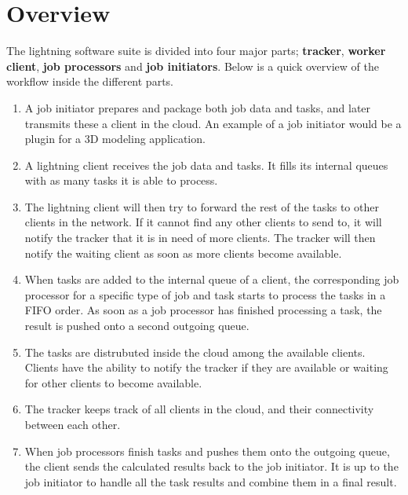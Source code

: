 \chapter{Overview}
The lightning software suite is divided into four major parts; \textbf{tracker}, \textbf{worker client}, \textbf{job processors} and \textbf{job initiators}. Below is a quick overview of the workflow inside the different parts. 

\begin{enumerate}
  \item A job initiator prepares and package both job data and tasks, and later transmits these a client in the cloud. An example of a job initiator would be a plugin for a 3D modeling application.
  \item A lightning client receives the job data and tasks. It fills its internal queues with as many tasks it is able to process.
  \item The lightning client will then try to forward the rest of the tasks to other clients in the network. If it cannot find any other clients to send to, it will notify the tracker that it is in need of more clients. The tracker will then notify the waiting client as soon as more clients become available.
  \item When tasks are added to the internal queue of a client, the corresponding job processor for a specific type of job and task  starts to process the tasks in a FIFO order. As soon as a job processor has finished processing a task, the result is pushed onto a second outgoing queue.
  \item The tasks are distrubuted inside the cloud among the available clients. Clients have the ability to notify the tracker if they are available or waiting for other clients to become available.
  \item The tracker keeps track of all clients in the cloud, and their connectivity between each other.
  \item When job processors finish tasks and pushes them onto the outgoing queue, the client sends the calculated results back to the job initiator. It is up to the job initiator to handle all the task results and combine them in a final result.
\end{enumerate}

